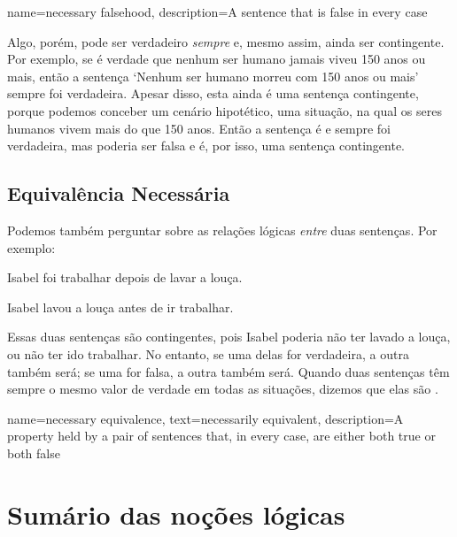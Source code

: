 {
name={necessary falsehood},
description={A sentence that is false in every case}
}

Algo, porém, pode ser verdadeiro \emph{sempre} e, mesmo assim, ainda ser contingente. Por exemplo, se é verdade que nenhum ser humano jamais viveu 150 anos ou mais, então a sentença `Nenhum ser humano morreu com 150 anos ou mais' sempre foi verdadeira.
Apesar disso, esta ainda é uma sentença contingente, porque podemos conceber um cenário hipotético, uma situação, na qual os seres humanos vivem mais do que 150 anos.
Então a sentença é e sempre foi verdadeira, mas poderia ser falsa e é, por isso, uma sentença contingente.


\subsection{Equivalência Necessária}

Podemos também perguntar sobre as relações lógicas \emph{entre} duas sentenças.
Por exemplo:
\begin{earg}
\item[] Isabel foi trabalhar depois de lavar a louça.
\item[] Isabel lavou a louça antes de ir trabalhar.
\end{earg}
Essas duas sentenças são contingentes, pois Isabel poderia não ter lavado a louça, ou não ter ido trabalhar.
No entanto, se uma delas for verdadeira, a outra também será; se uma for falsa, a outra também será.
Quando duas sentenças têm sempre o mesmo valor de verdade em todas as situações, dizemos que elas são .

{
name={necessary equivalence},
text={necessarily equivalent},
description={A property held by a pair of sentences that, in every case, are either both true or both false}
}


\section*{Sumário das noções lógicas}

